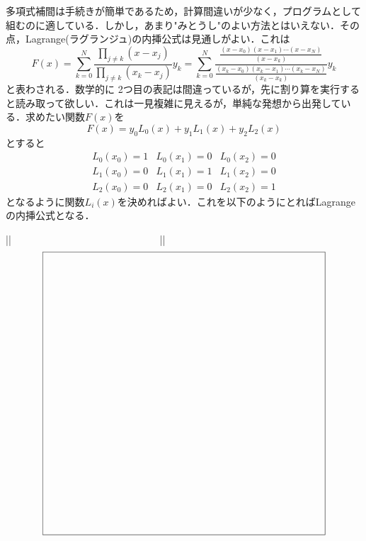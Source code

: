 多項式補間は手続きが簡単であるため，計算間違いが少なく，プログラムとして組むのに適している．しかし，あまり"みとうし"のよい方法とはいえない．その点，Lagrange(ラグランジュ)の内挿公式は見通しがよい．これは
\begin{equation*}
F(x)= \sum_{k=0}^N \frac{\displaystyle \prod_{j \ne k} (x-x_j)}
{\displaystyle \prod_{j \ne k} (x_k-x_j)} y_k
=\sum_{k=0}^N \frac{ \frac{\displaystyle (x-x_0)(x-x_1)\cdots(x-x_N)}{\displaystyle (x-x_k)}}
{\frac{\displaystyle (x_k-x_0)(x_k-x_1)\cdots(x_k-x_N)}{\displaystyle (x_k-x_k)}} y_k
\end{equation*}
と表わされる．数学的に 2つ目の表記は間違っているが，先に割り算を実行すると読み取って欲しい．これは一見複雑に見えるが，単純な発想から出発している．求めたい関数$F(x)$を
\begin{equation*}
F(x) = y_0 L_0(x)+y_1 L_1(x)+y_2 L_2(x)
\end{equation*}
とすると
\begin{equation*}
\begin{array}{ccc}
 L_0(x_0) = 1 &L_0(x_1) = 0 &L_0(x_2) = 0 \\
 L_1(x_0) = 0 &L_1(x_1) = 1 &L_1(x_2) = 0 \\
 L_2(x_0) = 0 &L_2(x_1) = 0 &L_2(x_2) = 1 
\end{array}
\end{equation*}
となるように関数$L_i(x)$を決めればよい．これを以下のようにとればLagrangeの内挿公式となる．
  
\ifHIKI %
||　　　　　　　　　　　　　　　||
\else %
\begin{equation*}
\setlength{\unitlength}{1cm}
\begin{picture}(10,10)
\put(0,0){\framebox(10,10){}}
\end{picture}
\end{equation*}
\fi %
